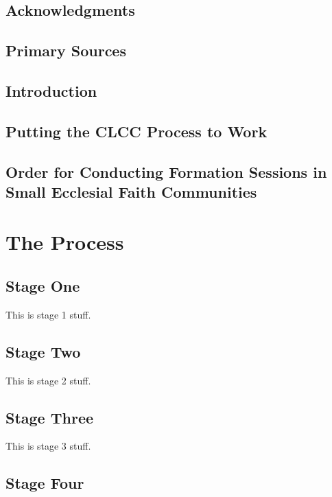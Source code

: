 \documentclass[oneside]{book}
\begin{document}
\chapter{Acknowledgments}

\chapter{Primary Sources}

\chapter{Introduction}

\chapter{Putting the CLCC Process to Work}

\chapter{Order for Conducting Formation Sessions in Small Ecclesial Faith Communities}

\tableofcontents

\mainmatter

\part{The Process}

\chapter{Stage One}

This is stage 1 stuff.

\chapter{Stage Two}

This is stage 2 stuff.

\chapter{Stage Three}

This is stage 3 stuff.

\chapter{Stage Four}
\end{document}
